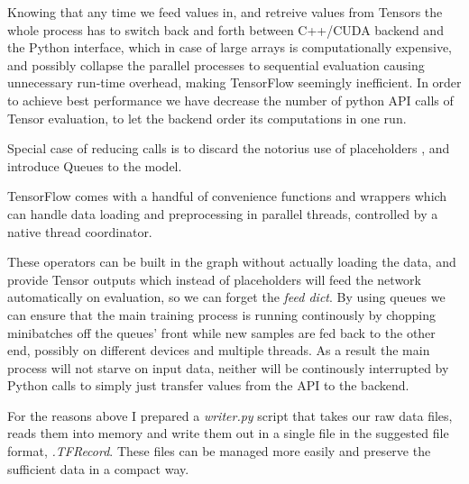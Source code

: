 Knowing that any time we feed values in, and retreive values from Tensors the whole process has to switch back and forth between C++/CUDA backend and the Python interface, which in case of large arrays is computationally expensive, and possibly collapse the parallel processes to sequential evaluation causing unnecessary run-time overhead, making TensorFlow seemingly inefficient.
In order to achieve best performance we have decrease the number of python API calls of Tensor evaluation, to let the backend order its computations in one run.

Special case of reducing calls is to discard the notorius use of placeholders \cite{placeholder-remove-MEDIUM-blog}, and introduce Queues to the model.

TensorFlow comes with a handful of convenience functions and wrappers which can handle data loading and preprocessing in parallel threads, controlled by a native thread coordinator.

These operators can be built in the graph without actually loading the data, and provide Tensor outputs which instead of placeholders will feed the network automatically on evaluation, so we can forget the \textit{feed dict}.
By using queues we can ensure that the main training process is running continously by chopping minibatches off the queues' front while new samples are fed back to the other end, possibly on different devices and multiple threads.
As a result the main process will not starve on input data, neither will be continously interrupted by Python calls to simply just transfer values from the API to the backend.

For the reasons above I prepared a \textit{writer.py} script that takes our raw data files, reads them into memory and write them out in a single file in the suggested file format, \textit{.TFRecord}. These files can be managed more easily and preserve the sufficient data in a compact way.
